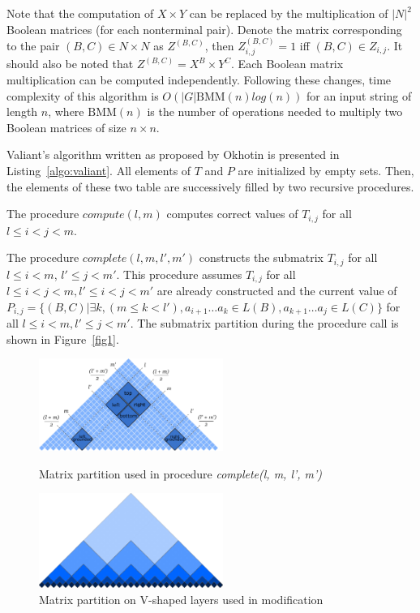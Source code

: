 Note that the computation of $X \times Y$  can be replaced by the multiplication of $|N|^2$ Boolean matrices (for each nonterminal pair).
Denote the matrix corresponding to the pair $(B, C) \in N \times N$ as $Z^{(B, C)}$, then $Z_{i, j}^{(B, C)} = 1$ iff $(B, C) \in Z_{i, j}$.
It should also be noted that $Z^{(B, C)} = X^{B} \times Y^{C}$.
Each Boolean matrix multiplication can be computed independently.
Following these changes, time complexity of this algorithm is $O(|G|\mathrm{BMM}(n)log(n))$ for an input string of length $n$, where $\mathrm{BMM}(n)$ is the number of operations needed to multiply two Boolean matrices of size $n \times n$.

Valiant's algorithm written as proposed by Okhotin is presented in Listing~\ref{algo:valiant}.
All elements of $T$ and $P$ are initialized by empty sets.
Then, the elements of these two table are successively filled by two recursive procedures.



The procedure $compute(l, m)$ computes correct values of $T_{i,j}$ for all $l \le i < j < m$.

The procedure $complete(l, m, l', m')$ constructs the submatrix $T_{i, j}$ for all $l \le i < m$, $l' \le j < m'$. This procedure assumes $T_{i, j}$ for all $l \leq i < j < m,  l' \leq i < j < m'$ are already constructed and the current value of  $P_{i, j} =  \{ (B, C) |\exists k, (m \le k < l'), a_{i + 1} \dots a_{k} \in L(B), a_{k + 1} \dots a_{j} \in L(C)\}$ for all $l \leq i < m,  l' \leq j < m'$.
The submatrix partition during the procedure call is shown in Figure~\ref{fig1}.


\begin{figure}
\vspace{3mm}
 \begin{center}
    \begin{minipage}{0.48\textwidth}
        \centering
        \includegraphics[width=6cm]{pictures/splitting_with_grounded.pdf}
        \caption{Matrix partition used in procedure \textit{complete(l, m, l', m')}}
        \label{fig1}
    \end{minipage}\hfill
    \begin{minipage}{0.48\textwidth}
        \centering
        \includegraphics[width=6cm]{pictures/layers.pdf}
        \caption{Matrix partition on V-shaped layers used in modification}
        \label{fig2}
    \end{minipage}
 \end{center}
\vspace{-8mm}
\end{figure}

